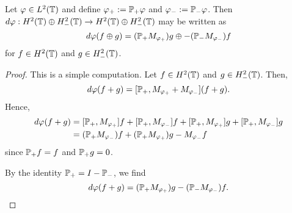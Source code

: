 \documentclass{unswmaths}
\begin{document}
\begin{lemma}
    Let $\varphi \in L^2(\mathbb{T})$ and define $\varphi_+ := \mathbb{P}_+ \varphi$ and $\varphi_- := \mathbb{P}_- \varphi$. Then $d\varphi:H^2(\mathbb{T})\oplus H^2_-(\mathbb{T})\rightarrow H^2(\mathbb{T})\oplus H^2_-(\mathbb{T})$ may be written as
    \begin{equation*}
        d\varphi(f\oplus g) = 
            (\mathbb{P}_+M_{\varphi_+})g \oplus
            -(\mathbb{P}_-M_{\varphi_-})f
    \end{equation*}
    for $f \in H^2(\mathbb{T})$ and $g \in H^2_-(\mathbb{T})$.
\end{lemma}
\begin{proof}
    This is a simple computation. Let $f \in H^2(\mathbb{T})$ and $g \in H^2_-(\mathbb{T})$. Then,
    \begin{equation*}
        d\varphi(f+g) = [\mathbb{P}_+,M_{\varphi_+}+M_{\varphi_-}](f+g).
    \end{equation*}
    Hence,
    \begin{align*}
        d\varphi(f+g) &= [\mathbb{P}_+,M_{\varphi_+}]f + [\mathbb{P}_+,M_{\varphi_-}]f + [\mathbb{P}_+,M_{\varphi_+}]g + [\mathbb{P}_+,M_{\varphi_-}]g\\
        &= (\mathbb{P}_+M_{\varphi_-})f+(\mathbb{P}_+M_{\varphi_+})g-M_{\varphi_-}f
    \end{align*}
    since $\mathbb{P}_+f = f$ and $\mathbb{P}_+g = 0$.
    
    By the identity $\mathbb{P}_+ = I-\mathbb{P}_-$, we find
    \begin{equation*}
        d\varphi(f+g) = (\mathbb{P}_+M_{\varphi_+})g - (\mathbb{P}_-M_{\varphi_-})f.
    \end{equation*}
\end{proof}
\end{document}
